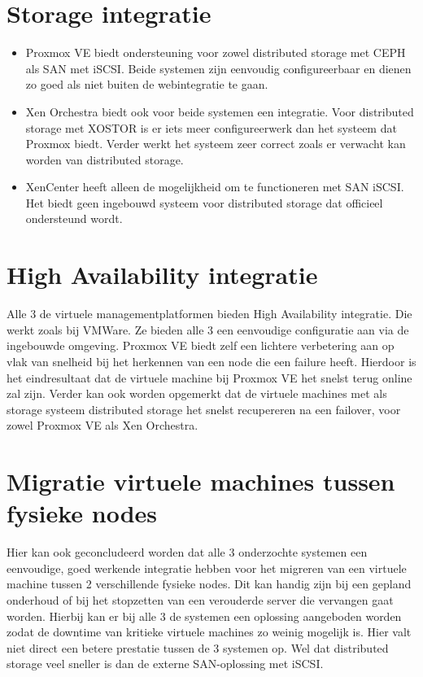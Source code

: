 \section{Storage integratie}
\begin{itemize}
\item Proxmox VE biedt ondersteuning voor zowel distributed storage met CEPH als SAN met iSCSI. Beide systemen zijn eenvoudig configureerbaar en dienen zo goed als niet buiten de webintegratie te gaan.
\item Xen Orchestra biedt ook voor beide systemen een integratie. Voor distributed storage met XOSTOR is er iets meer configureerwerk dan het systeem dat Proxmox biedt. Verder werkt het systeem zeer correct zoals er verwacht kan worden van distributed storage.
\item XenCenter heeft alleen de mogelijkheid om te functioneren met SAN iSCSI. Het biedt geen ingebouwd systeem voor distributed storage dat officieel ondersteund wordt.
\end{itemize}

\section{High Availability integratie}
Alle 3 de virtuele managementplatformen bieden High Availability integratie. Die werkt zoals bij VMWare. Ze bieden alle 3 een eenvoudige configuratie aan via de ingebouwde omgeving.
Proxmox VE biedt zelf een lichtere verbetering aan op vlak van snelheid bij het herkennen van een node die een failure heeft. Hierdoor is het eindresultaat dat de virtuele machine bij Proxmox VE het snelst terug online zal zijn.
Verder kan ook worden opgemerkt dat de virtuele machines met als storage systeem distributed storage het snelst recupereren na een failover, voor zowel Proxmox VE als Xen Orchestra.

\section{Migratie virtuele machines tussen fysieke nodes}
Hier kan ook geconcludeerd worden dat alle 3 onderzochte systemen een eenvoudige, goed werkende integratie hebben voor het migreren van een virtuele machine tussen 2 verschillende fysieke nodes.
Dit kan handig zijn bij een gepland onderhoud of bij het stopzetten van een verouderde server die vervangen gaat worden. Hierbij kan er bij alle 3 de systemen een oplossing aangeboden worden zodat de downtime van kritieke virtuele machines zo weinig mogelijk is.
Hier valt niet direct een betere prestatie tussen de 3 systemen op. Wel dat distributed storage veel sneller is dan de externe SAN-oplossing met iSCSI.

